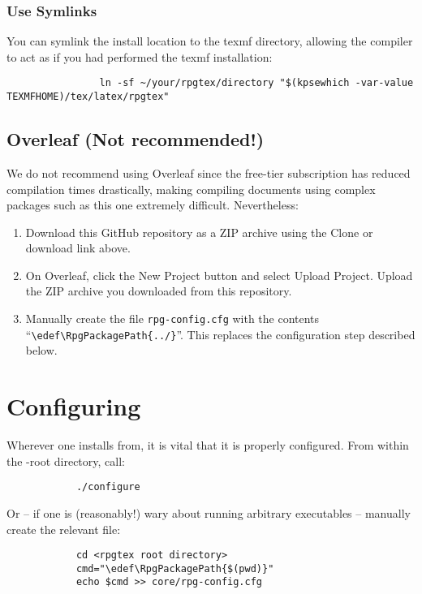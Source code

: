 			\subsubsection{Use Symlinks}

			You can symlink the install location to the texmf directory, allowing the compiler to act as if you had performed the texmf installation:

			\begin{lstlisting}
				ln -sf ~/your/rpgtex/directory "$(kpsewhich -var-value TEXMFHOME)/tex/latex/rpgtex"
			\end{lstlisting}

		\subsection{Overleaf (Not recommended!)}

			We do not recommend using Overleaf since the free-tier subscription has reduced compilation times drastically, making compiling documents using complex packages such as this one extremely difficult. Nevertheless:

			\begin{enumerate}
				\item  Download this GitHub repository as a ZIP archive using the Clone or download link above.
    			\item On Overleaf, click the New Project button and select Upload Project. Upload the ZIP archive you downloaded from this repository.
				\item Manually create the file \texttt{rpg-config.cfg} with the contents ``\verb|\edef\RpgPackagePath{../}|''. This replaces the configuration step described below.
			\end{enumerate}


	\section{Configuring \rpgtex{}}\label{S:Configuration}

		Wherever one installs \rpgtex{} from, it is vital that it is properly configured. From within the \rpgtex{}-root directory, call:

		\begin{lstlisting}
			./configure
		\end{lstlisting}
		Or -- if one is (reasonably!) wary about running arbitrary executables -- manually create the relevant file:
		\begin{lstlisting}
			cd <rpgtex root directory>
			cmd="\edef\RpgPackagePath{$(pwd)}"
			echo $cmd >> core/rpg-config.cfg
		\end{lstlisting}

